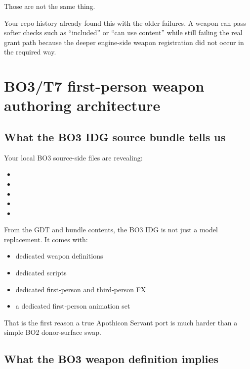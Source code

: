 \documentclass[11pt]{article}
\begin{document}
Those are not the same thing.

Your repo history already found this with the older  failures. A weapon can pass softer checks such as ``included'' or ``can use content'' while still failing the real grant path because the deeper engine-side weapon registration did not occur in the required way.

\section{BO3/T7 first-person weapon authoring architecture}

\subsection{What the BO3 IDG source bundle tells us}

Your local BO3 source-side files are revealing:

\begin{itemize}
  \item {}
  \item {}
  \item {}
  \item {}
  \item {}
\end{itemize}

From the GDT and bundle contents, the BO3 IDG is not just a model replacement. It comes with:

\begin{itemize}
  \item dedicated weapon definitions
  \item dedicated scripts
  \item dedicated first-person and third-person FX
  \item a dedicated first-person animation set
\end{itemize}

That is the first reason a true Apothicon Servant port is much harder than a simple BO2 donor-surface swap.

\subsection{What the BO3 weapon definition implies}
\end{document}
